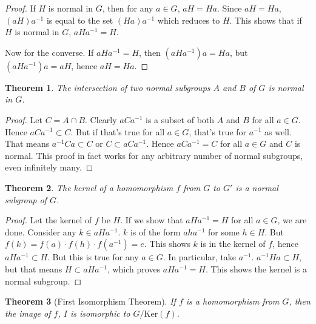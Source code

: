 \documentclass[12pt]{article}
\newtheorem{thm}{Theorem}[section]
\theoremstyle{definition}
\begin{document}
\begin{proof}
If $H$ is normal in $G$, then for any $a \in G$, $aH=Ha$. Since $aH=Ha$, $(aH)a^{-1}$ is equal to the set $(Ha)a^{-1}$ which reduces to $H$. This shows that if $H$ is normal in $G$, $aHa^{-1}=H$.

Now for the converse. If $aHa^{-1}=H$, then $(aHa^{-1})a = Ha$, but $(aHa^{-1})a = aH$, hence $aH = Ha$.
\end{proof}

\begin{thm}\label{normal}
The intersection of two normal subgroups $A$ and $B$ of $G$ is normal in $G$.
\end{thm}

\begin{proof}
Let $C = A \cap B$. Clearly $aCa^{-1}$ is a subset of both $A$ and $B$ for all $a \in G$. Hence $aCa^{-1} \subset C$. But if that's true for all $a \in G$, that's true for $a^{-1}$ as well. That means $a^{-1}Ca \subset C$ or $C \subset aCa^{-1}$. Hence $aCa^{-1} = C$ for all $a \in G$ and $C$ is normal. This proof in fact works for any arbitrary number of normal subgroups, even infinitely many.
\end{proof}

\begin{thm}
The kernel of a homomorphism $f$ from $G$ to $G'$ is a normal subgroup of $G$.
\end{thm}

\begin{proof}
Let the kernel of $f$ be $H$. If we show that $aHa^{-1}=H$ for all $a \in G$, we are done. Consider any $k \in aHa^{-1}$. $k$ is of the form $aha^{-1}$ for some $h \in H$. But $f(k)= f(a) \cdot f(h) \cdot f(a^{-1}) = e$. This shows $k$ is in the kernel of $f$, hence $aHa^{-1} \subset H$. But this is true for any $a \in G$. In particular, take $a^{-1}$. $a^{-1}Ha \subset H$, but that means $H \subset aHa^{-1}$, which proves $aHa^{-1}=H$. This shows the kernel is a normal subgroup.
\end{proof}

\begin{thm}[First Isomorphism Theorem]
If $f$ is a homomorphism from $G$, then the image of $f$, $I$ is isomorphic to $G/\mathrm{Ker}(f)$.
\end{thm}
\end{document}
